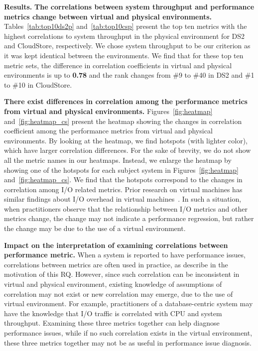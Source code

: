 \documentclass[smallextended]{svjour3}       %
\begin{document}
\noindent \textbf{Results.}
\noindent \textbf{The correlations between system throughput and performance metrics change between virtual and physical environments.} Tables~\ref{tab:top10ds2p} and~\ref{tab:top10csp} present the top ten metrics with the highest correlations to system throughput in the physical environment for DS2 and CloudStore, respectively. We chose system throughput to be our criterion as it was kept identical between the environments.  We find that for these top ten metric sets, the difference in correlation coefficients in virtual and physical environments is up to \textbf{0.78} and the rank changes from \#9 to \#40 in DS2 and \#1 to \#10 in CloudStore.

\noindent \textbf{There exist differences in correlation among the performance metrics from virtual and physical environments.} Figures~\ref{fig:heatmap} and~\ref{fig:heatmap_cs} present the heatmap showing the changes in correlation coefficient among the performance metrics from virtual and physical environments. By looking at the heatmap, we find hotspots (with lighter color), which have larger correlation differences. For the sake of brevity, we do not show all the metric names in our heatmaps. Instead, we enlarge the heatmap by showing one of the hotspots for each subject system in Figures~\ref{fig:heatmap} and~\ref{fig:heatmap_cs}. We find that the hotspots correspond to the changes in correlation among I/O related metrics. Prior research on virtual machines has similar findings about I/O overhead in virtual machines~\cite{menon2005diagnosing,kraft2011io}. In such a situation, when practitioners observe that the relationship between I/O metrics and other metrics change, the change may not indicate a performance regression, but rather the change may be due to the use of a virtual environment.

\noindent \textbf{Impact on the interpretation of examining correlations between performance metric.} When a system is reported to have performance issues, correlations between metrics are often used in practice, as describe in the motivation of this RQ. However, since such correlation can be inconsistent in virtual and physical environment, existing knowledge of assumptions of correlation may not exist or new correlation may emerge, due to the use of virtual environment. For example, practitioners of a database-centric system may have the knowledge that I/O traffic is correlated with CPU and system throughput. Examining these three metrics together can help diagnose performance issues, while if no such correlation exists in the virtual environment, these three metrics together may not be as useful in performance issue diagnosis.
\end{document}
